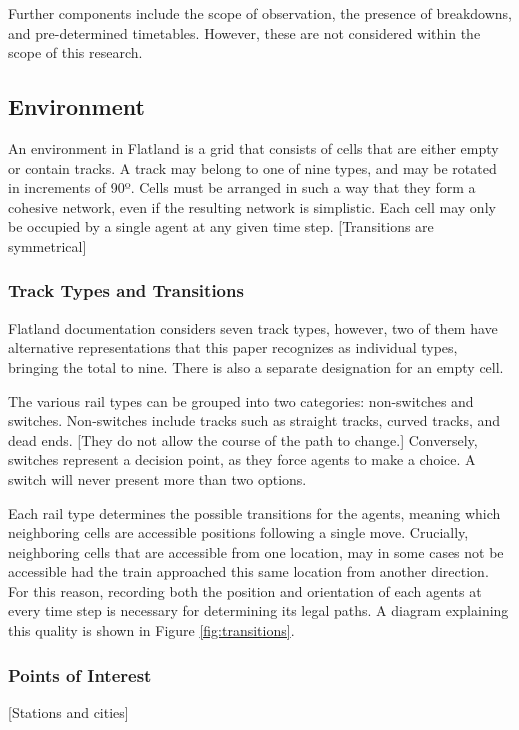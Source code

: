 \documentclass[11pt]{article}
\begin{document}
Further components include the scope of observation, the presence of breakdowns, and pre-determined timetables.  However, these are not considered within the scope of this research.

\subsection{Environment}
\label{sec:Environment}
An environment in Flatland is a grid that consists of cells that are either empty or contain tracks.  A track may belong to one of nine types, and may be rotated in increments of 90º.  Cells must be arranged in such a way that they form a cohesive network, even if the resulting network is simplistic.  Each cell may only be occupied by a single agent at any given time step.  [Transitions are symmetrical]

\subsubsection{Track Types and Transitions}
\label{sec:Track}
Flatland documentation considers seven track types, however, two of them have alternative representations that this paper recognizes as individual types, bringing the total to nine.  There is also a separate designation for an empty cell.

The various rail types can be grouped into two categories: non-switches and switches.  Non-switches include tracks such as straight tracks, curved tracks, and dead ends.  [They do not allow the course of the path to change.]  Conversely, switches represent a decision point, as they force agents to make a choice.  A switch will never present more than two options.

Each rail type determines the possible transitions for the agents, meaning which neighboring cells are accessible positions following a single move.  Crucially, neighboring cells that are accessible from one location, may in some cases not be accessible had the train approached this same location from another direction.  For this reason, recording both the position and orientation of each agents at every time step is necessary for determining its legal paths.  A diagram explaining this quality is shown in Figure \ref{fig:transitions}.

\subsubsection{Points of Interest}
[Stations and cities]
\end{document}
